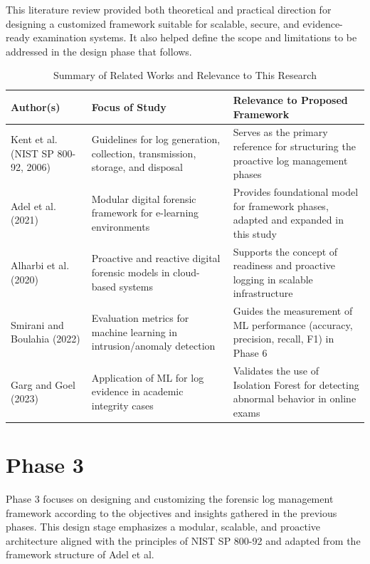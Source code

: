 This literature review provided both theoretical and practical direction for designing a customized framework suitable for scalable, secure, and evidence-ready examination systems. It also helped define the scope and limitations to be addressed in the design phase that follows.
\begin{table}[H]
\centering
\caption{Summary of Related Works and Relevance to This Research}
\label{tab:literature_review}
\begin{tabular}{|p{3.5cm}|p{4.5cm}|p{4.5cm}|}
\hline
\textbf{Author(s)} & \textbf{Focus of Study} & \textbf{Relevance to Proposed Framework} \\
\hline
Kent et al. (NIST SP 800-92, 2006) \cite{kentnist800922006guide} & Guidelines for log generation, collection, transmission, storage, and disposal & Serves as the primary reference for structuring the proactive log management phases \\
\hline
Adel et al. (2021) \cite{adel2024ethicore} & Modular digital forensic framework for e-learning environments & Provides foundational model for framework phases, adapted and expanded in this study \\
\hline
Alharbi et al. (2020) \cite{proactiveandreactivedigitalforensics} & Proactive and reactive digital forensic models in cloud-based systems & Supports the concept of readiness and proactive logging in scalable infrastructure \\
\hline
Smirani and Boulahia (2022) \cite{smirani2022algorithm} & Evaluation metrics for machine learning in intrusion/anomaly detection & Guides the measurement of ML performance (accuracy, precision, recall, F1) in Phase 6 \\
\hline
Garg and Goel (2023) \citet{garg2023preserving} & Application of ML for log evidence in academic integrity cases & Validates the use of Isolation Forest for detecting abnormal behavior in online exams \\
\hline
\end{tabular}
\end{table}

\section{Phase 3}
Phase 3 focuses on designing and customizing the forensic log management framework according to the objectives and insights gathered in the previous phases. This design stage emphasizes a modular, scalable, and proactive architecture aligned with the principles of NIST SP 800-92 and adapted from the framework structure of Adel et al.

